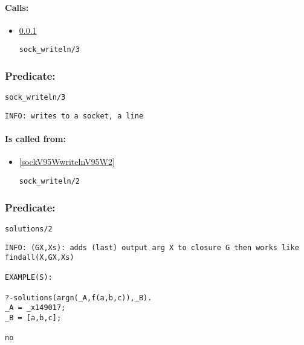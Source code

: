 \paragraph{Calls:} 
\begin{itemize}
\item \ref{sockV95WwritelnV95W3} 
\begin{verbatim}
sock_writeln/3
\end{verbatim}

\end{itemize}

\subsubsection{Predicate:} \label{sockV95WwritelnV95W3}

\begin{verbatim}
sock_writeln/3
\end{verbatim}

{\small \begin{verbatim}
INFO: writes to a socket, a line

\end{verbatim}}
\paragraph{Is called from:} 
\begin{itemize}
\item \ref{sockV95WwritelnV95W2} 
\begin{verbatim}
sock_writeln/2
\end{verbatim}

\end{itemize}

\subsubsection{Predicate:} \label{solutionsV95W2}

\begin{verbatim}
solutions/2
\end{verbatim}

{\small \begin{verbatim}
INFO: (GX,Xs): adds (last) output arg X to closure G then works like findall(X,GX,Xs)

EXAMPLE(S):

?-solutions(argn(_A,f(a,b,c)),_B).
_A = _x149017;
_B = [a,b,c];

no

\end{verbatim}}
